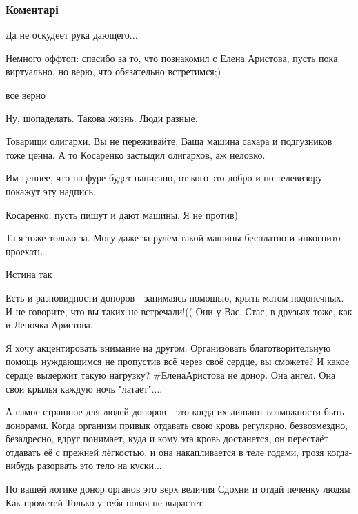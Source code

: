  
 
 
 
 
\subsubsection{Коментарі}
\label{sec:25_11_2021.fb.kosarenko_stas.zaporozhie.1.ljudi.cmt}

\begin{itemize} %
Да не оскудеет рука дающего...

Немного оффтоп: спасибо за то, что познакомил с Елена Аристова, пусть пока виртуально, но верю, что обязательно встретимся;)

все верно

Ну, шопаделать. Такова жизнь. Люди разные.

Товарищи олигархи.
Вы не переживайте, Ваша машина сахара и подгузников тоже ценна.
А то Косаренко застыдил олигархов, аж неловко.

\begin{itemize} %
Им ценнее, что на фуре будет написано, от кого это добро и по телевизору покажут эту надпись.

Косаренко, пусть пишут и дают машины. Я не против)

Та я тоже только за. Могу даже за рулём такой машины бесплатно и инкогнито проехать.
\end{itemize} %

Истина так


Есть и разновидности доноров - занимаясь помощью, крыть матом подопечных. И не
говорите, что вы таких не встречали!(( Они у Вас, Стас, в друзьях тоже, как и
Леночка Аристова.

Я хочу акцентировать внимание на другом. Организовать благотворительную помощь
нуждающимся не пропустив всё через своё сердце, вы сможете? И какое сердце
выдержит такую нагрузку? \#ЕленаАристова не донор. Она ангел. Она свои крылья
каждую ночь "латает"....


А самое страшное для людей-доноров - это когда их лишают возможности быть
донорами. Когда организм привык отдавать свою кровь регулярно, безвозмездно,
безадресно, вдруг понимает, куда и кому эта кровь достанется, он перестаёт
отдавать её с прежней лёгкостью, и она накапливается в теле годами, грозя
когда-нибудь разорвать это тело на куски...


По вашей логике донор органов это верх величия
Сдохни и отдай печенку людям
Как прометей
Только у тебя новая не вырастет

\end{itemize} %
